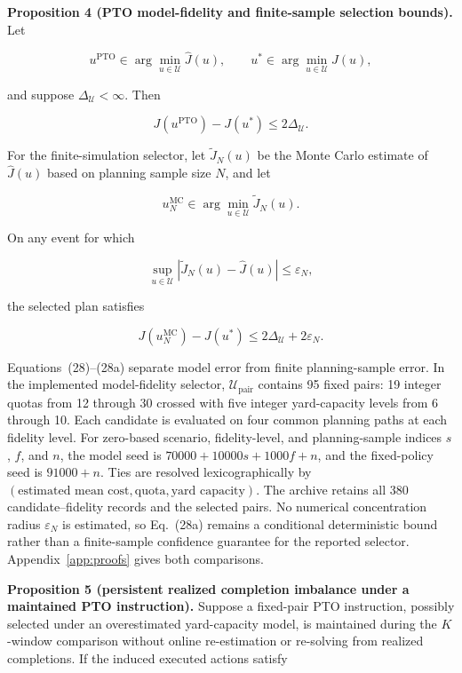 \documentclass[preprint,12pt,authoryear,a4paper]{elsarticle}
\begin{document}
\noindent\textbf{Proposition 4 (PTO model-fidelity and finite-sample selection bounds).} Let

\[
u^{\mathrm{PTO}}
\in\arg\min_{u\in\mathcal U}\widehat J(u),
\qquad
u^*\in\arg\min_{u\in\mathcal U}J(u),
\]

and suppose \(\Delta_{\mathcal U}<\infty\). Then

\[
J(u^{\mathrm{PTO}})-J(u^*)
\le2\Delta_{\mathcal U}.
\tag{28}
\]

For the finite-simulation selector, let \(\widetilde J_N(u)\) be the Monte Carlo estimate of \(\widehat J(u)\) based on planning sample size \(N\), and let

\[
u_N^{\mathrm{MC}}
\in\arg\min_{u\in\mathcal U}\widetilde J_N(u).
\]

On any event for which

\[
\sup_{u\in\mathcal U}
\left|\widetilde J_N(u)-\widehat J(u)\right|
\le\varepsilon_N,
\]

the selected plan satisfies

\[
J(u_N^{\mathrm{MC}})-J(u^*)
\le2\Delta_{\mathcal U}+2\varepsilon_N.
\tag{28a}
\]

Equations~(28)--(28a) separate model error from finite planning-sample error. In the implemented model-fidelity selector, \(\mathcal U_{\mathrm{pair}}\) contains 95 fixed pairs: 19 integer quotas from 12 through 30 crossed with five integer yard-capacity levels from 6 through 10. Each candidate is evaluated on four common planning paths at each fidelity level. For zero-based scenario, fidelity-level, and planning-sample indices \(s\), \(f\), and \(n\), the model seed is \(70000+10000s+1000f+n\), and the fixed-policy seed is \(91000+n\). Ties are resolved lexicographically by \((\text{estimated mean cost},\text{quota},\text{yard capacity})\). The archive retains all 380 candidate--fidelity records and the selected pairs. No numerical concentration radius \(\varepsilon_N\) is estimated, so Eq.~(28a) remains a conditional deterministic bound rather than a finite-sample confidence guarantee for the reported selector. Appendix~\ref{app:proofs} gives both comparisons.

\noindent\textbf{Proposition 5 (persistent realized completion imbalance under a maintained PTO instruction).} Suppose a fixed-pair PTO instruction, possibly selected under an overestimated yard-capacity model, is maintained during the \(K\)-window comparison without online re-estimation or re-solving from realized completions. If the induced executed actions satisfy
\end{document}
